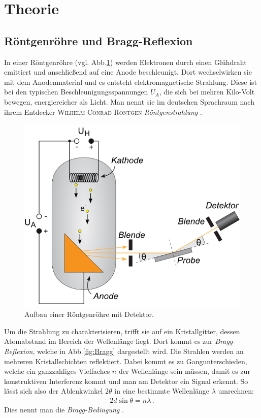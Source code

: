 \documentclass[12pt,a4paper,titlepage,headinclude,bibtotoc]{scrartcl}
\begin{document}
\section{Theorie}
\label{sec:theorie}
\subsection{Röntgenröhre und Bragg-Reflexion}
In einer Röntgenröhre (vgl. Abb.\ref{fig:Aufbau}) werden Elektronen durch einen Glühdraht emittiert und anschließend auf eine Anode beschleunigt.
Dort wechselwirken sie mit dem Anodenmaterial und es entsteht elektromagnetische Strahlung.
Diese ist bei den typischen Beschleunigungsspannungen $U_A$, die sich bei mehren Kilo-Volt bewegen, energiereicher als Licht.
Man nennt sie im deutschen Sprachraum nach ihrem Entdecker \textsc{Wilhelm Conrad Röntgen} \emph{Röntgenstrahlung} \cite[S.828]{gerthsen}. \\
\begin{figure}[!h]
	\centering
	\includegraphics[scale=0.7]{Aufbau.png}
	\caption{Aufbau einer Röntgenröhre mit Detektor. \cite[Datum: 02.01.15]{LP23}}
	\label{fig:Aufbau}
\end{figure}

Um die Strahlung zu charakterisieren, trifft sie auf ein Kristallgitter, dessen Atomabstand im Bereich der Wellenlänge liegt.
Dort kommt es zur \emph{Bragg-Reflexion}, welche in Abb.\ref{fig:Bragg} dargestellt wird.
Die Strahlen werden an mehreren Kristallschichten reflektiert.
Dabei kommt es zu Gangunterschieden, welche ein ganzzahliges Vielfaches $n$ der Wellenlänge sein müssen, damit es zur konstruktiven Interferenz kommt und man am Detektor ein Signal erkennt.
So lässt sich also der Ablenkwinkel $2\theta$ in eine bestimmte Wellenlänge $\lambda$ umrechnen:
\begin{align}
	2d\sin\theta=n\lambda\,.
	\label{eq:Bragg}
\end{align}
Dies nennt man die \emph{Bragg-Bedingung} \cite[S.830]{gerthsen}.
\end{document}
